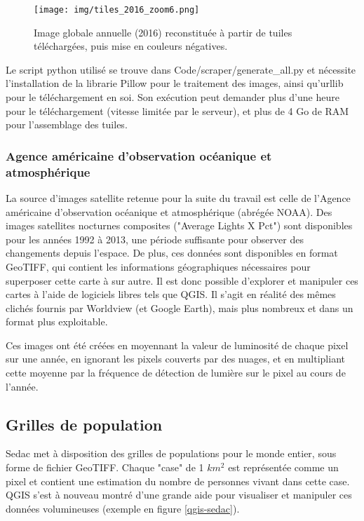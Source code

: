 \documentclass[a4paper, 11pt]{report}
\begin{document}
\begin{figure}
	\centering
	\texttt{[image: img/tiles\_2016\_zoom6.png]}
	\caption{Image globale annuelle (2016) reconstituée à partir de tuiles téléchargées, puis mise en couleurs négatives.}
	\label{nasa-worldview-tiles}
\end{figure}

Le script python utilisé se trouve dans Code/scraper/generate\_all.py et nécessite l'installation de la librarie Pillow pour le traitement des images, ainsi qu'urllib pour le téléchargement en soi. Son exécution peut demander plus d'une heure pour le téléchargement (vitesse limitée par le serveur), et plus de 4 Go de RAM pour l'assemblage des tuiles.

\subsubsection{Agence américaine d'observation océanique et atmosphérique}
La source d'images satellite retenue pour la suite du travail est celle de l'Agence américaine d'observation océanique et atmosphérique (abrégée NOAA)\cite{noaa}. Des images satellites nocturnes composites ("Average Lights X Pct") sont disponibles pour les années 1992 à 2013, une période suffisante pour observer des changements depuis l'espace. De plus, ces données sont disponibles en format GeoTIFF, qui contient les informations géographiques nécessaires pour superposer cette carte à sur autre. Il est donc possible d'explorer et manipuler ces cartes à l'aide de logiciels libres tels que QGIS. Il s'agit en réalité des mêmes clichés fournis par Worldview (et Google Earth), mais plus nombreux et dans un format plus exploitable.

Ces images ont été créées en moyennant la valeur de luminosité de chaque pixel sur une année, en ignorant les pixels couverts par des nuages, et en multipliant cette moyenne par la fréquence de détection de lumière sur le pixel au cours de l'année.

\subsection{Grilles de population}
Sedac \cite{sedac} met à disposition des grilles de populations pour le monde entier, sous forme de fichier GeoTIFF. Chaque "case" de 1 $km^2$ est représentée comme un pixel et contient une estimation du nombre de personnes vivant dans cette case. QGIS s'est à nouveau montré d'une grande aide pour visualiser et manipuler ces données volumineuses (exemple en figure \ref{qgis-sedac}).
\end{document}
